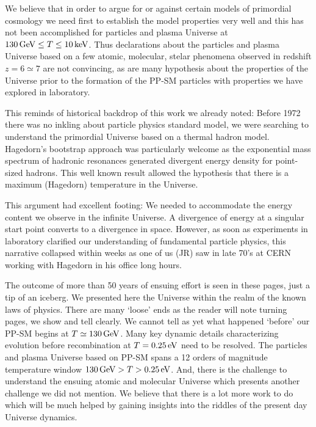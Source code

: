 We believe that in order to argue for or against certain models of primordial cosmology we need first to establish the model properties very well and this has not been accomplished for particles and plasma Universe at $130\text{\,GeV}\le T\le 10\text{\,keV}$. Thus declarations about the particles and plasma Universe based on a few atomic, molecular, stelar phenomena observed in redshift $z=6\simeq7$ are not convincing, as are many hypothesis about the properties of the Universe prior to the formation of the PP-SM particles with properties we have explored in laboratory. 

This reminds of historical backdrop of this work we already noted: Before 1972 there was no inkling about particle physics standard model, we were searching to understand the primordial Universe based on a thermal hadron model. Hagedorn's bootstrap approach was particularly welcome as the exponential mass spectrum of hadronic resonances generated divergent energy density for point-sized hadrons. This well known result allowed the hypothesis that there is a maximum (Hagedorn) temperature in the Universe. 

This argument had excellent footing: We needed to accommodate the energy content we observe in the infinite Universe. A divergence of energy at a singular start point converts to a divergence in space. However, as soon as experiments in laboratory clarified our understanding of fundamental particle physics, this narrative collapsed within weeks as one of us  (JR) saw in late 70's at CERN working with Hagedorn in his office long hours. 

The outcome of more than 50 years of ensuing effort is seen in these pages, just a tip of an iceberg. We presented here the Universe within the realm of the known laws of physics. There are many `loose' ends as the reader will note turning pages, we show and tell clearly. We cannot tell as yet what happened `before' our PP-SM begins at $T\simeq 130\text{\,GeV}$. Many key dynamic details characterizing evolution before recombination at $T=0.25\text{\,eV}$ need to be resolved. The particles and plasma Universe based on PP-SM spans a 12 orders of magnitude temperature window $  130\text{\,GeV} > T > 0.25\text{\,eV} $. And, there is the challenge to understand the ensuing  atomic and molecular Universe  which presents another challenge we did not mention. We believe that there is a lot more work to do which will be much helped by gaining insights into the riddles of the present day Universe dynamics.